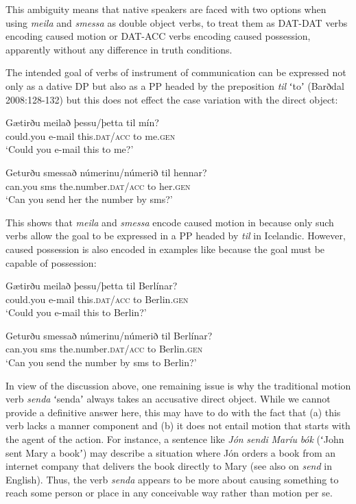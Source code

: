\documentclass[output=paper,modfonts,nonflat]{langsci/langscibook}
\begin{document}
This ambiguity means that native speakers are faced with two options when using \textit{meila} and \textit{smessa} as double object verbs, to treat them as DAT-DAT verbs encoding caused motion or DAT-ACC verbs encoding caused possession, apparently without any difference in truth conditions. 

The intended goal of verbs of instrument of communication can be expressed not only as a dative DP but also as a PP headed by the preposition \textit{til} ʻtoʼ (Barðdal 2008:128-132) but this does not effect the case variation with the direct object:

 
\ea%
    \label{ex:jonsson:12}  
\ea
\gll  Gætirðu  meilað  þessu/þetta  til  mín?\\
   could.you  e-mail  this.\textsc{dat/acc}  to  me.\textsc{gen}\\
\glt `Could you e-mail this to me?' 

\ex
\gll   Geturðu  smessað  númerinu/númerið  til  hennar?\\
 can.you  sms  the.number.\textsc{dat/acc}  to  her.\textsc{gen}\\
\glt `Can you send her the number by sms?'
\z
\z

This shows that \textit{meila} and \textit{smessa} encode caused motion in  because only such verbs allow the goal to be expressed in a PP headed by \textit{til} in Icelandic. However, caused possession is also encoded in examples like  because the goal must be capable of possession:

 
\ea%
    \label{ex:jonsson:13}  
\ea
\gll  *Gætirðu  meilað  þessu/þetta  til  Berlínar?\\
   could.you  e-mail  this.\textsc{dat/acc}  to  Berlin.\textsc{gen}\\
\glt `Could you e-mail this to Berlin?' 

\ex
\gll   *Geturðu  smessað  númerinu/númerið  til  Berlínar?\\
 can.you  sms  the.number.\textsc{dat/acc}  to  Berlin.\textsc{gen}\\
\glt `Can you send the number by sms to Berlin?'
\z
\z

In view of the discussion above, one remaining issue is why the traditional motion verb \textit{senda} ʻsendaʼ always takes an accusative direct object. While we cannot provide a definitive answer here, this may have to do with the fact that (a) this verb lacks a manner component and (b) it does not entail motion that starts with the agent of the action. For instance, a sentence like \textit{Jón} \textit{sendi} \textit{Maríu} \textit{bók} (ʻJohn sent Mary a bookʼ) may describe a situation where Jón orders a book from an internet company that delivers the book directly to Mary (see also \citealt{Beavers2011} on \textit{send} in English). Thus, the verb \textit{senda} appears to be more about causing something to reach some person or place in any conceivable way rather than motion per se. 
\end{document}
